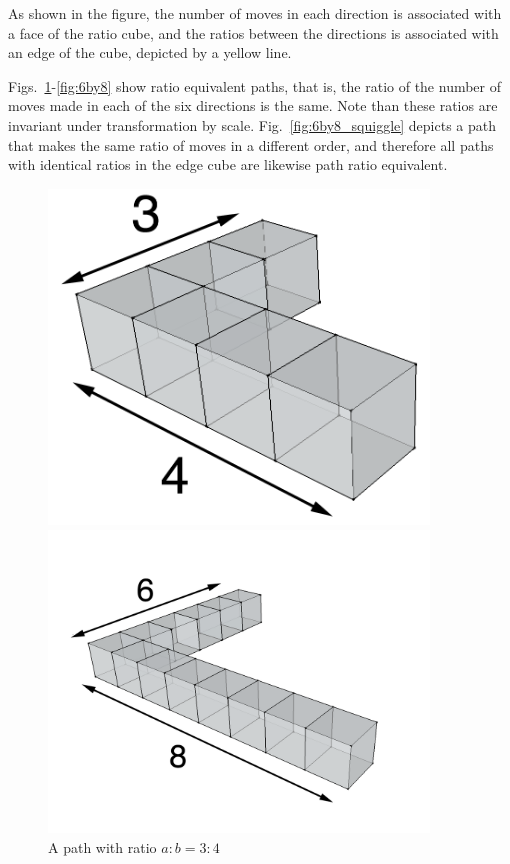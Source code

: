 As shown in the figure, the number of moves in each direction is associated with a face of the ratio cube, and the ratios between the directions is associated with an edge of the cube, depicted by a yellow line.


Figs.~\ref{fig:3by4}-\ref{fig:6by8} show ratio equivalent paths, that is, the ratio of the number of moves made in each of the six directions is the same.
Note than these ratios are invariant under transformation by scale.
Fig.~\ref{fig:6by8_squiggle} depicts a path that makes the same ratio of moves in a different order, and therefore all paths with identical ratios in the edge cube are likewise path ratio equivalent.


\begin{figure}
\centering
  \begin{minipage}[t]{.45\textwidth}
  \centering
  \includegraphics[width=0.9\textwidth]{./figures/3by4}
    \caption{A path with ratio $a:b = 3:4$}
		\label{fig:3by4}
  \end{minipage}
  \begin{minipage}[t]{.45\textwidth}
  \centering
  \includegraphics[width=0.9\textwidth]{./figures/6by8}

\end{minipage}
\end{figure}
